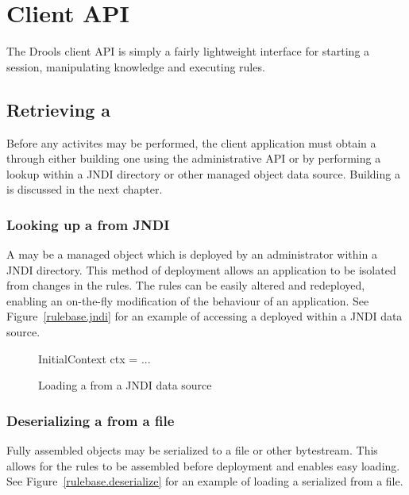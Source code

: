 \chapter{Client API}

The Drools client API is simply a fairly lightweight interface for
starting a session, manipulating knowledge and executing rules.

\section{Retrieving a }

Before any activites may be performed, the client application must
obtain a  through either building one using
the administrative API or by performing a lookup within a JNDI
directory or other managed object data source.  Building
a  is discussed in the next chapter.

\subsection{Looking up a  from JNDI}

A  may be a managed object which is deployed
by an administrator within a JNDI directory. This method of deployment
allows an application to be isolated from changes in the rules.  The
rules can be easily altered and redeployed, enabling an on-the-fly
modification of the behaviour of an application.  See
Figure~\vref{rulebase.jndi} for an example of accessing a
 deployed within a JNDI data source.

\begin{figure}
\begin{javaCodelisting}
InitialContext ctx = ...
\end{javaCodelisting}
\caption{Loading a  from a JNDI data source}
\label{rulebase.jndi}
\end{figure}

\subsection{Deserializing a  from a file}

Fully assembled  objects may be serialized to a
file or other bytestream.  This allows for the rules to be assembled
before deployment and enables easy loading.  See
Figure~\vref{rulebase.deserialize} for an example of loading a
serialized  from a file.

